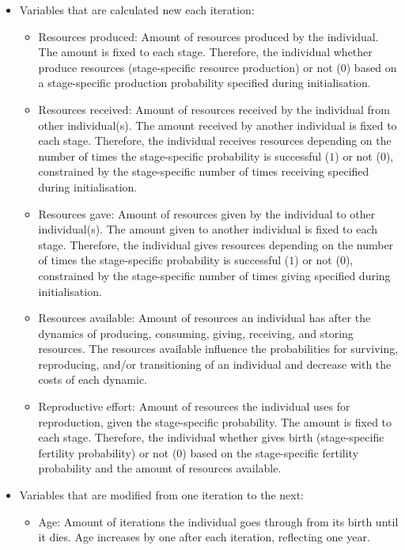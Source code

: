 \documentclass{article}
\begin{document}
\begin{itemize}
    \item Variables that are calculated new each iteration:
    \begin{itemize}
        \item Resources produced: Amount of resources produced by the individual. The amount is fixed to each stage. Therefore, the individual whether produce resources (stage-specific resource production) or not (0) based on a stage-specific production probability specified during initialisation.
        \item Resources received: Amount of resources received by the individual from other individual(s). The amount received by another individual is fixed to each stage. Therefore, the individual receives resources depending on the number of times the stage-specific probability is successful ($1$) or not ($0$), constrained by the stage-specific number of times receiving specified during initialisation.
        \item Resources gave: Amount of resources given by the individual to other individual(s). The amount given to another individual is fixed to each stage. Therefore, the individual gives resources depending on the number of times the stage-specific probability is successful ($1$) or not ($0$), constrained by the stage-specific number of times giving specified during initialisation.
        \item Resources available: Amount of resources an individual has after the dynamics of producing, consuming, giving, receiving, and storing resources. The resources available influence the probabilities for surviving, reproducing, and/or transitioning of an individual and decrease with the costs of each dynamic.
        \item Reproductive effort: Amount of resources the individual uses for reproduction, given the stage-specific probability. The amount is fixed to each stage. Therefore, the individual whether gives birth (stage-specific fertility probability)  or not (0) based on the stage-specific fertility probability and the amount of resources available.
    \end{itemize}
    \item Variables that are modified from one iteration to the next:
    \begin{itemize}
        \item Age: Amount of iterations the individual goes through from its birth until it dies. Age increases by one after each iteration, reflecting one year.

\end{itemize}
\end{itemize}
\end{document}
